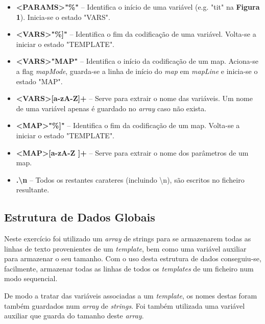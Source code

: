 \documentclass{article}
\begin{document}
\begin{itemize}
    \item \textbf{\textless PARAMS\textgreater "\%"} -- Identifica o início de uma variável (e.g. "tit" na \textbf{Figura 1}). Inicia-se o estado "VARS".
    
    \item \textbf{\textless VARS\textgreater "\%]"} -- Identifica o fim da codificação de uma variável. Volta-se a iniciar o estado "TEMPLATE".
    
    \item \textbf{\textless VARS\textgreater "MAP"} -- Identifica o início da codificação de um map. Aciona-se a flag \emph{mapMode}, guarda-se a linha de início do \emph{map} em \emph{mapLine} e inicia-se o estado "MAP".
    
    \item \textbf{\textless VARS\textgreater [a-zA-Z]+} -- Serve para extrair o nome das variáveis. Um nome de uma variável apenas é guardado no \emph{array} caso não exista.
    
    \item \textbf{\textless MAP\textgreater "\%]"} -- Identifica o fim da codificação de um map. Volta-se a iniciar o estado "TEMPLATE".
    
    \item \textbf{\textless MAP\textgreater [a-zA-Z ]+} -- Serve para extrair o nome dos parâmetros de um map.
    
    \item \textbf{.\textvert{}\textbackslash{}n} -- Todos os restantes carateres (incluindo \textbackslash{}n), são escritos no ficheiro resultante.
\end{itemize}


\subsection{Estrutura de Dados Globais}

Neste exercício foi utilizado um \emph{array} de {strings} para se armazenarem todas as linhas de texto provenientes de um \emph{template}, bem como uma variável auxiliar para armazenar o seu tamanho. Com o uso desta estrutura de dados conseguiu-se, facilmente, armazenar todas as linhas de todos os \emph{templates} de um ficheiro num modo sequencial.

De modo a tratar das variáveis associadas a um \emph{template}, os nomes destas foram também guardados num \emph{array} de \emph{strings}. Foi também utilizada uma variável auxiliar que guarda do tamanho deste \emph{array}.
\end{document}
